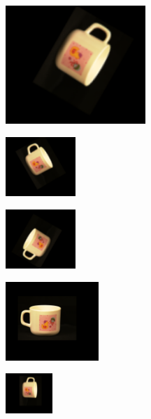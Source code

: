 \begin{figure}[tbp]
	\begin{subfigure}{0.4\textwidth}
        \centering
    \includegraphics[width=150pt]{figures/inv_img/36x8y5r240s1_5.png}
	\caption{}\label{fig:inv_img1}
	\end{subfigure}
	\begin{subfigure}{0.29\textwidth}
        \centering
    \includegraphics[width=75pt]{figures/inv_img/36x8y5r300s0_75.png}
    \caption{}\label{fig:inv_img2}
	\end{subfigure}
	\begin{subfigure}{0.29\textwidth}
        \centering
    \includegraphics[width=75pt]{figures/inv_img/36x8y5r60s0_75.png}
    \caption{}\label{fig:inv_img3}
	\end{subfigure}
	\begin{subfigure}{0.3\textwidth}
        \centering
    \includegraphics[width=100pt]{figures/inv_img/36x8y5r0s1_0.png}
    \caption{}\label{fig:inv_img4}
	\end{subfigure}
	\begin{subfigure}{0.3\textwidth}
        \centering
    \includegraphics[width=50pt]{figures/inv_img/36x8y5r270s0_5.png}

\end{subfigure}
\end{figure}
